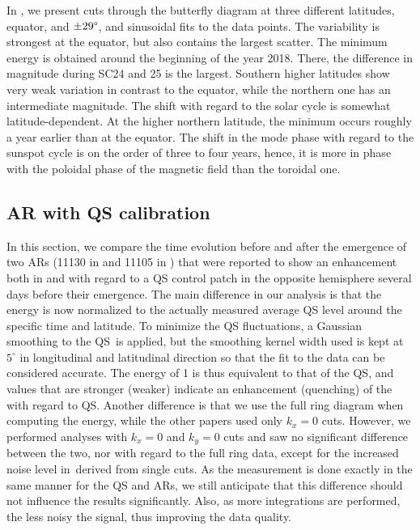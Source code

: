 \documentclass{aa}
\begin{document}
In , we present cuts through the butterfly
diagram at three different latitudes, equator, and $\pm 29\degree$, and sinusoidal fits to the data points. The variability is strongest at the equator, but also contains the largest scatter. The minimum \fff energy 
is obtained
around the beginning of the year 2018. There, the difference in magnitude during SC24 and 25 is the largest. Southern higher latitudes show very weak variation in contrast to the equator, 
while the northern one has an intermediate magnitude. 
The shift with regard to the solar cycle is somewhat latitude-dependent. At the higher northern latitude, the \fff minimum occurs roughly a year earlier than at the equator. The shift in the \fff mode phase with regard to the sunspot cycle is on the order of three to four years, hence, it is more in phase with the 
poloidal phase of the magnetic field than the toroidal one.

\subsection{AR \fff with QS calibration}\label{arf}

In this section, we compare the \fff time evolution before and after the emergence of 
two ARs (11130 in  and 11105 in ) that were reported to show an enhancement both in \cite{SRB16} and \cite{Waidele22} with regard to a QS control patch
in the opposite hemisphere several days before their emergence. The main difference in our analysis
is that the \fff energy is now normalized to the actually measured average QS level
around the specific time and latitude. To minimize
the QS fluctuations, a Gaussian smoothing to the QS \ef\,is applied, 
but the smoothing kernel width used is kept at 
$5^\circ$ in longitudinal and latitudinal direction
so that the fit to the data can be considered accurate. The
\fff energy of 1 is thus
equivalent to that of the QS, and values that are stronger (weaker) 
indicate an enhancement (quenching) of the \fff with regard to QS.
Another difference is that we use the
full ring diagram when computing the \fff energy, while the
other papers used only $k_x=0$ cuts. 
However, we performed
analyses with $k_x=0$ and $k_y=0$ cuts and 
saw
no significant difference between the two, nor with regard to the full ring data, except for the
increased noise level in \ef\,derived from single cuts.
As the measurement is done exactly in the same
manner for the QS and ARs, we still anticipate
that this difference should not influence the results significantly. 
Also, as more integrations are performed, the less noisy the 
signal, thus improving the data quality. 
\end{document}
